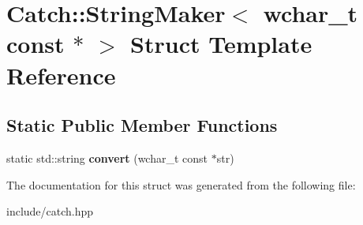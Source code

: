 \hypertarget{structCatch_1_1StringMaker_3_01wchar__t_01const_01_5_01_4}{}\section{Catch\+:\+:String\+Maker$<$ wchar\+\_\+t const $\ast$ $>$ Struct Template Reference}
\label{structCatch_1_1StringMaker_3_01wchar__t_01const_01_5_01_4}
\subsection*{Static Public Member Functions}
\begin{DoxyCompactItemize}
\item 
static std\+::string {\bfseries convert} (wchar\+\_\+t const $\ast$str)\hypertarget{structCatch_1_1StringMaker_3_01wchar__t_01const_01_5_01_4_ae7535a1f417ace45ca05e4389334ffeb}{}\label{structCatch_1_1StringMaker_3_01wchar__t_01const_01_5_01_4_ae7535a1f417ace45ca05e4389334ffeb}

\end{DoxyCompactItemize}


The documentation for this struct was generated from the following file\+:\begin{DoxyCompactItemize}
\item 
include/catch.\+hpp\end{DoxyCompactItemize}
